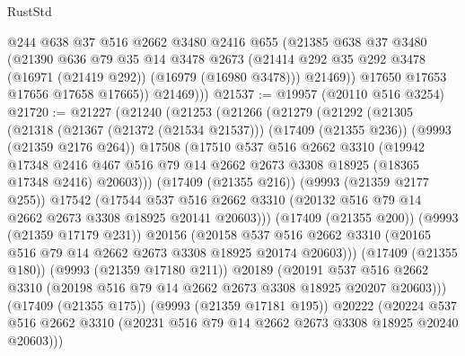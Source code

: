 \begin{lexlean}{RustStd}
\begin{coremodule}
              @244
              @638
              @37
              @516
              @2662
              @3480
              @2416
              @655
              (@21385
                @638
                @37
                @3480
                (@21390
                  @636
                  @79
                  @35
                  @14
                  @3478
                  @2673
                  (@21414 @292 @35 @292 @3478 (@16971 (@21419 @292)) (@16979 (@16980 @3478)))
                  @21469))
              @17650
              @17653
              @17656
              @17658
              @17665))
          @21469)))
@21537 := @19957 (@20110 @516 @3254)
@21720 := @21227
    (@21240
      (@21253
        (@21266
          (@21279
            (@21292
              (@21305
                (@21318
                  (@21367 (@21372 (@21534 @21537)))
                  (@17409 (@21355 @236))
                  (@9993 (@21359 @2176 @264))
                  @17508
                  (@17510
                    @537
                    @516
                    @2662
                    @3310
                    (@19942
                      @17348
                      @2416
                      @467
                      @516
                      @79
                      @14
                      @2662
                      @2673
                      @3308
                      @18925
                      (@18365 @17348 @2416)
                      @20603)))
                (@17409 (@21355 @216))
                (@9993 (@21359 @2177 @255))
                @17542
                (@17544
                  @537
                  @516
                  @2662
                  @3310
                  (@20132 @516 @79 @14 @2662 @2673 @3308 @18925 @20141 @20603)))
              (@17409 (@21355 @200))
              (@9993 (@21359 @17179 @231))
              @20156
              (@20158
                @537
                @516
                @2662
                @3310
                (@20165 @516 @79 @14 @2662 @2673 @3308 @18925 @20174 @20603)))
            (@17409 (@21355 @180))
            (@9993 (@21359 @17180 @211))
            @20189
            (@20191
              @537
              @516
              @2662
              @3310
              (@20198 @516 @79 @14 @2662 @2673 @3308 @18925 @20207 @20603)))
          (@17409 (@21355 @175))
          (@9993 (@21359 @17181 @195))
          @20222
          (@20224
            @537
            @516
            @2662
            @3310
            (@20231 @516 @79 @14 @2662 @2673 @3308 @18925 @20240 @20603)))

\end{coremodule}
\end{lexlean}

